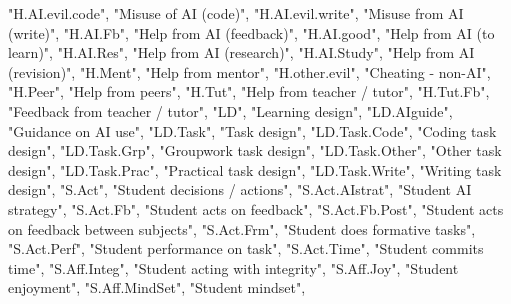 \documentclass[
  letterpaper,
  DIV=11,
  numbers=noendperiod]{scrartcl}
\newenvironment{Shaded}{\begin{snugshade}}{\end{snugshade}}
\newcommand{\NormalTok}[1]{\textcolor[rgb]{0.00,0.23,0.31}{#1}}
\newcommand{\StringTok}[1]{\textcolor[rgb]{0.13,0.47,0.30}{#1}}
\begin{document}
\begin{Shaded}
\begin{Highlighting}[]
    \StringTok{"H.AI.evil.code"}\NormalTok{, }\StringTok{"Misuse of AI (code)"}\NormalTok{,}
    \StringTok{"H.AI.evil.write"}\NormalTok{, }\StringTok{"Misuse from AI (write)"}\NormalTok{,}
    \StringTok{"H.AI.Fb"}\NormalTok{, }\StringTok{"Help from AI (feedback)"}\NormalTok{,}
    \StringTok{"H.AI.good"}\NormalTok{, }\StringTok{"Help from AI (to learn)"}\NormalTok{,}
    \StringTok{"H.AI.Res"}\NormalTok{, }\StringTok{"Help from AI (research)"}\NormalTok{,}
    \StringTok{"H.AI.Study"}\NormalTok{, }\StringTok{"Help from AI (revision)"}\NormalTok{,}
    \StringTok{"H.Ment"}\NormalTok{, }\StringTok{"Help from mentor"}\NormalTok{,}
    \StringTok{"H.other.evil"}\NormalTok{, }\StringTok{"Cheating {-} non{-}AI"}\NormalTok{,}
    \StringTok{"H.Peer"}\NormalTok{, }\StringTok{"Help from peers"}\NormalTok{,}
    \StringTok{"H.Tut"}\NormalTok{, }\StringTok{"Help from teacher / tutor"}\NormalTok{,}
    \StringTok{"H.Tut.Fb"}\NormalTok{, }\StringTok{"Feedback from teacher / tutor"}\NormalTok{,}
    \StringTok{"LD"}\NormalTok{, }\StringTok{"Learning design"}\NormalTok{,}
    \StringTok{"LD.AIguide"}\NormalTok{, }\StringTok{"Guidance on AI use"}\NormalTok{,}
    \StringTok{"LD.Task"}\NormalTok{, }\StringTok{"Task design"}\NormalTok{,}
    \StringTok{"LD.Task.Code"}\NormalTok{, }\StringTok{"Coding task design"}\NormalTok{,}
    \StringTok{"LD.Task.Grp"}\NormalTok{, }\StringTok{"Groupwork task design"}\NormalTok{,}
    \StringTok{"LD.Task.Other"}\NormalTok{, }\StringTok{"Other task design"}\NormalTok{,}
    \StringTok{"LD.Task.Prac"}\NormalTok{, }\StringTok{"Practical task design"}\NormalTok{,}
    \StringTok{"LD.Task.Write"}\NormalTok{, }\StringTok{"Writing task design"}\NormalTok{,}
    \StringTok{"S.Act"}\NormalTok{, }\StringTok{"Student decisions / actions"}\NormalTok{,}
    \StringTok{"S.Act.AIstrat"}\NormalTok{, }\StringTok{"Student AI strategy"}\NormalTok{,}
    \StringTok{"S.Act.Fb"}\NormalTok{, }\StringTok{"Student acts on feedback"}\NormalTok{,}
    \StringTok{"S.Act.Fb.Post"}\NormalTok{, }\StringTok{"Student acts on feedback between subjects"}\NormalTok{,}
    \StringTok{"S.Act.Frm"}\NormalTok{, }\StringTok{"Student does formative tasks"}\NormalTok{,}
    \StringTok{"S.Act.Perf"}\NormalTok{, }\StringTok{"Student performance on task"}\NormalTok{,}
    \StringTok{"S.Act.Time"}\NormalTok{, }\StringTok{"Student commits time"}\NormalTok{,}
    \StringTok{"S.Aff.Integ"}\NormalTok{, }\StringTok{"Student acting with integrity"}\NormalTok{,}
    \StringTok{"S.Aff.Joy"}\NormalTok{, }\StringTok{"Student enjoyment"}\NormalTok{,}
    \StringTok{"S.Aff.MindSet"}\NormalTok{, }\StringTok{"Student mindset"}\NormalTok{,}

\end{Highlighting}
\end{Shaded}
\end{document}
